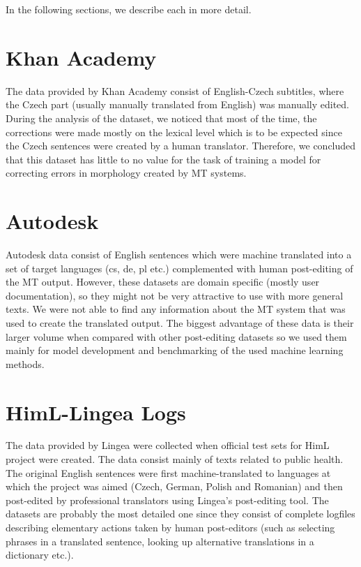 In the following sections, we describe each in more detail.

\section{Khan Academy}

The data provided by Khan Academy consist of English-Czech subtitles,
where the Czech part (usually manually translated from English) was manually
edited. During the analysis of the dataset,
we noticed that most of the time, the corrections were made
mostly on the lexical level which is to be expected since the Czech sentences
were created by a human translator.
Therefore, we concluded that this dataset has little to no value
for the task of training a model for correcting errors in morphology created by MT systems.


\section{Autodesk}

Autodesk data consist of English sentences which were machine translated into
a set of target languages (cs, de, pl etc.) complemented with human post-editing
of the MT output. However, these datasets are domain specific (mostly user documentation),
so they might not be very attractive to use with more general texts.
We were not able to find any information about the MT system that was used
to create the translated output. The biggest advantage of these data is
their larger volume when compared with other post-editing datasets so we
used them mainly for model development and benchmarking of the used machine
learning methods.

\section{HimL-Lingea Logs}

The data provided by Lingea were collected when official test sets for
HimL project were
created. The data consist mainly of texts related to public health.
The original English sentences were first
machine-translated to languages at which
the project was aimed (Czech, German, Polish and Romanian)
and then post-edited by professional
translators using Lingea's post-editing tool. The datasets are probably the most
detailed one since they consist of complete logfiles
describing elementary actions taken by human post-editors (such as selecting
phrases in a translated sentence, looking up alternative translations
in a dictionary etc.).

